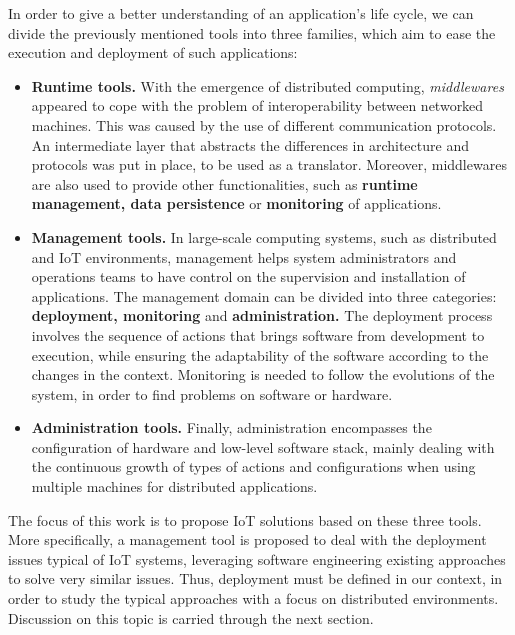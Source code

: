 In order to give a better understanding of an application's life cycle, we can divide the previously mentioned tools into three families, which aim to ease the execution and deployment of such applications:
\begin{itemize}
	\item \textbf{Runtime tools.} With the emergence of distributed computing, \textit{middlewares} appeared to cope with the problem of interoperability between networked machines.
	This was caused by the use of different communication protocols.
	An intermediate layer that abstracts the differences in architecture and protocols was put in place, to be used as a translator.
	Moreover, middlewares are also used to provide other functionalities, such as \textbf{runtime management, data persistence} or \textbf{monitoring} of applications.
	\item \textbf{Management tools.} In large-scale computing systems, such as distributed and IoT environments, management helps system administrators and operations teams to have control on the supervision and installation of applications.
	The management domain can be divided into three categories: \textbf{deployment, monitoring} and \textbf{administration.}
	The deployment process involves the sequence of actions that brings software from development to execution, while ensuring the adaptability of the software according to the changes in the context.
	Monitoring is needed to follow the evolutions of the system, in order to find problems on software or hardware.
	\item \textbf{Administration tools.} Finally, administration encompasses the configuration of hardware and low-level software stack, mainly dealing with the continuous growth of types of actions and configurations when using multiple machines for distributed applications.
\end{itemize}

The focus of this work is to propose IoT solutions based on these three tools.
More specifically, a management tool is proposed to deal with the deployment issues typical of IoT systems, leveraging software engineering existing approaches to solve very similar issues.
Thus, deployment must be defined in our context, in order to study the typical approaches with a focus on distributed environments.
Discussion on this topic is carried through the next section.

